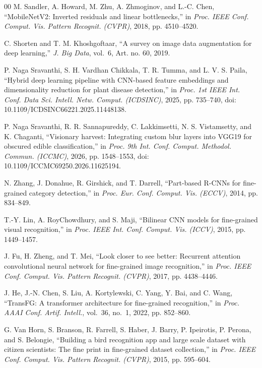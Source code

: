 \documentclass[conference]{IEEEtran}
\begin{document}
\begin{thebibliography}{00}
 M. Sandler, A. Howard, M. Zhu, A. Zhmoginov, and L.-C. Chen,
``MobileNetV2: Inverted residuals and linear bottlenecks,'' in \emph{Proc. IEEE
Conf. Comput. Vis. Pattern Recognit. (CVPR)}, 2018, pp. 4510--4520.

 C. Shorten and T. M. Khoshgoftaar, ``A survey on image data
augmentation for deep learning,'' \emph{J. Big Data}, vol.~6, Art. no. 60, 2019.

 P. Naga Sravanthi, S. H. Vardhan Chikkala, T. R. Tumma,
and L. V. S. Paila, ``Hybrid deep learning pipeline with CNN-based feature
embeddings and dimensionality reduction for plant disease detection,'' in
\emph{Proc. 1st IEEE Int. Conf. Data Sci. Intell. Netw. Comput. (ICDSINC)}, 2025,
pp. 735--740, doi: 10.1109/ICDSINC66221.2025.11448138.

 P. Naga Sravanthi, R. R. Sannapureddy, C. Lakkimsetti,
N. S. Vistamsetty, and K. Chaganti, ``Visionary harvest: Integrating custom blur
layers into VGG19 for obscured edible classification,'' in \emph{Proc. 9th Int.
Conf. Comput. Methodol. Commun. (ICCMC)}, 2026, pp. 1548--1553,
doi: 10.1109/ICCMC69250.2026.11625194.

 N. Zhang, J. Donahue, R. Girshick, and T. Darrell, ``Part-based
R-CNNs for fine-grained category detection,'' in \emph{Proc. Eur. Conf. Comput.
Vis. (ECCV)}, 2014, pp. 834--849.

 T.-Y. Lin, A. RoyChowdhury, and S. Maji, ``Bilinear CNN models for
fine-grained visual recognition,'' in \emph{Proc. IEEE Int. Conf. Comput. Vis.
(ICCV)}, 2015, pp. 1449--1457.

 J. Fu, H. Zheng, and T. Mei, ``Look closer to see better:
Recurrent attention convolutional neural network for fine-grained image
recognition,'' in \emph{Proc. IEEE Conf. Comput. Vis. Pattern Recognit. (CVPR)},
2017, pp. 4438--4446.

 J. He, J.-N. Chen, S. Liu, A. Kortylewski, C. Yang, Y. Bai, and
C. Wang, ``TransFG: A transformer architecture for fine-grained recognition,'' in
\emph{Proc. AAAI Conf. Artif. Intell.}, vol.~36, no.~1, 2022, pp. 852--860.

 G. Van Horn, S. Branson, R. Farrell, S. Haber, J. Barry,
P. Ipeirotis, P. Perona, and S. Belongie, ``Building a bird recognition app and
large scale dataset with citizen scientists: The fine print in fine-grained
dataset collection,'' in \emph{Proc. IEEE Conf. Comput. Vis. Pattern Recognit.
(CVPR)}, 2015, pp. 595--604.


\end{thebibliography}
\end{document}
